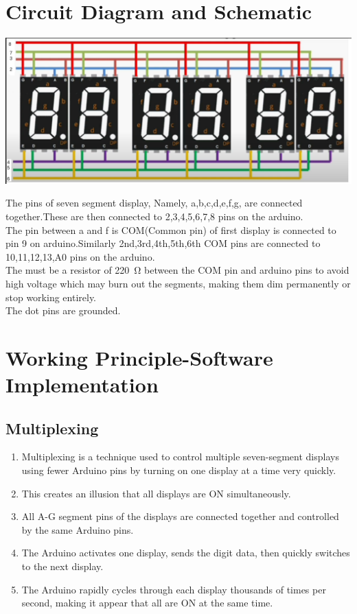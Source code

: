 \documentclass[journal]{IEEEtran}
\begin{document}
\section{Circuit Diagram and Schematic}

\begin{center}
    \includegraphics[width=0.75\columnwidth]{Connections/Connections.png}
\end{center}

The pins of seven segment display, Namely, a,b,c,d,e,f,g, are connected together.These are then connected to 2,3,4,5,6,7,8 pins on the arduino.\\
The pin between a and f is COM(Common pin) of first display is connected to pin 9 on arduino.Similarly 2nd,3rd,4th,5th,6th COM pins are connected to 10,11,12,13,A0 pins on the arduino.\\
The must be a resistor of \SI{220}{\ohm} between the COM pin and arduino pins to avoid high voltage which may  burn out the segments, making them dim permanently or stop working entirely.\\
The dot pins are grounded.\\

\section{Working Principle-Software Implementation}

\subsection{Multiplexing}
\begin{enumerate}
    \item Multiplexing is a technique used to control multiple seven-segment displays using fewer Arduino pins by turning on one display at a time very quickly.
    \item This creates an illusion that all displays are ON simultaneously.
    \item All A-G segment pins of the displays are connected together and controlled by the same Arduino pins.
    \item The Arduino activates one display, sends the digit data, then quickly switches to the next display.
    \item The Arduino rapidly cycles through each display thousands of times per second, making it appear that all are ON at the same time.
\end{enumerate}
\end{document}

